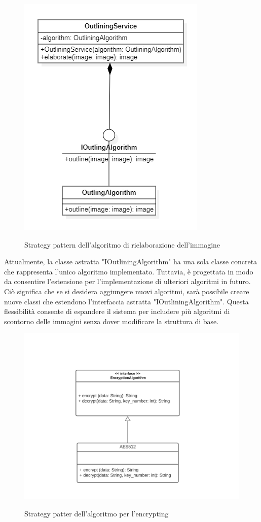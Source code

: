 \begin{figure}[H]
    \centering
    \includegraphics[scale = 1.0]{img/outlineStrategy.png}\\
    \caption{Strategy pattern dell'algoritmo di rielaborazione dell'immagine}
\end{figure}

Attualmente, la classe astratta "IOutliningAlgorithm" ha una sola classe concreta che rappresenta l'unico algoritmo implementato. Tuttavia, è progettata in modo da consentire l'estensione per l'implementazione di ulteriori 
algoritmi in futuro. Ciò significa che se si desidera aggiungere nuovi algoritmi, 
sarà possibile creare nuove classi che estendono l'interfaccia astratta "IOutliningAlgorithm". 
Questa flessibilità consente di espandere il sistema per includere più algoritmi di scontorno delle immagini senza dover 
modificare la struttura di base.

\begin{figure}[H]
    \centering
    \includegraphics[scale = 1.0]{img/criptStrategy.png}\\
    \caption{Strategy patter dell'algoritmo per l'encrypting}
\end{figure}

